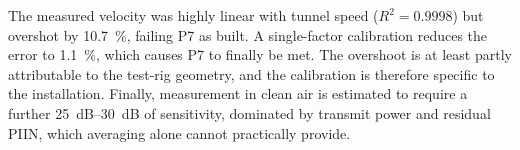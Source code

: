  The measured velocity was highly linear with tunnel speed
($R^2 = 0.9998$) but overshot by \SI{10.7}{\percent}, failing P7 as built. A
single-factor calibration reduces the error to \SI{1.1}{\percent}, which causes P7 to finally be met.
The overshoot is at least partly attributable to the test-rig geometry, and
the calibration is therefore specific to the installation. Finally,
measurement in clean air is estimated to require a further
\SIrange[range-phrase=--, range-units=single]{25}{30}{dB} of sensitivity,
dominated by transmit power and residual PIIN, which averaging alone cannot
practically provide.










